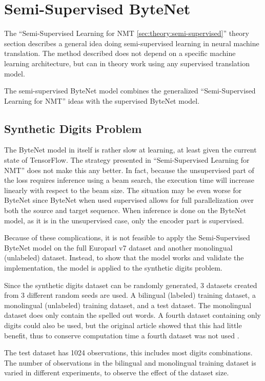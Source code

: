 
\section{Semi-Supervised ByteNet}

The ``Semi-Supervised Learning for NMT \ref{sec:theory:semi-supervised}'' theory section describes a general idea doing semi-supervised learning in neural machine translation. The method described does not depend on a specific machine learning architecture, but can in theory work using any supervised translation model.

The semi-supervised ByteNet model combines the generalized ``Semi-Supervised Learning for NMT'' ideas with the supervised ByteNet model.

\subsection{Synthetic Digits Problem}

The ByteNet model in itself is rather slow at learning, at least given the current state of TensorFlow. The strategy presented in ``Semi-Supervised Learning for NMT'' does not make this any better. In fact, because the unsupervised part of the loss requires inference using a beam search, the execution time will increase linearly with respect to the beam size. The situation may be even worse for ByteNet since ByteNet when used supervised allows for full parallelization over both the source and target sequence. When inference is done on the ByteNet model, as it is in the unsupervised case, only the encoder part is supervised.

Because of these complications, it is not feasible to apply the Semi-Supervised ByteNet model on the full Europarl v7 dataset and another monolingual (unlabeled) dataset. Instead, to show that the model works and validate the implementation, the model is applied to the synthetic digits problem.

Since the synthetic digits dataset can be randomly generated, 3 datasets created from 3 different random seeds are used. A bilingual (labeled) training dataset, a monolingual (unlabeled) training dataset, and a test dataset. The monolingual dataset does only contain the spelled out words. A fourth dataset containing only digits could also be used, but the original article showed that this had little benefit, thus to conserve computation time a fourth dataset was not used \cite{semi-supervised}.

The test dataset has 1024 observations, this includes most digits combinations. The number of observations in the bilingual and monolingual training dataset is varied in different experiments, to observe the effect of the dataset size.

